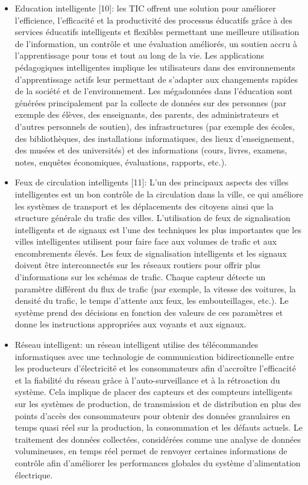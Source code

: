 \documentclass[french, a4paper, 12pt]{report}
\begin{document}
\begin{itemize}
\item \textbf{}Education intelligente [10]: les TIC offrent une solution pour améliorer l'efficience, l'efficacité et la productivité des processus éducatifs grâce à des services éducatifs intelligents et flexibles permettant une meilleure utilisation de l'information, un contrôle et une évaluation améliorés, un soutien accru à l'apprentissage pour tous et tout au long de la vie. Les applications pédagogiques intelligentes implique les utilisateurs dans des environnements d’apprentissage actifs leur permettant de s’adapter aux changements rapides de la société et de l’environnement. Les mégadonnées dans l'éducation sont générées principalement par la collecte de données sur des personnes (par exemple des élèves, des enseignants, des parents, des administrateurs et d'autres personnels de soutien), des infrastructures (par exemple des écoles, des bibliothèques, des installations informatiques, des lieux d'enseignement, des musées et des universités) et des informations (cours, livres, examens, notes, enquêtes économiques, évaluations, rapports, etc.). 
\item \textbf{}Feux de circulation intelligents [11]: L’un des principaux aspects des villes intelligentes est un bon contrôle de la circulation dans la ville, ce qui améliore les systèmes de transport et les déplacements des citoyens ainsi que la structure générale du trafic des villes. L'utilisation de feux de signalisation intelligents et de signaux est l'une des techniques les plus importantes que les villes intelligentes utilisent pour faire face aux volumes de trafic et aux encombrements élevés. Les feux de signalisation intelligents et les signaux doivent être interconnectés sur les réseaux routiers pour offrir plus d'informations sur les schémas de trafic. Chaque capteur détecte un paramètre différent du flux de trafic (par exemple, la vitesse des voitures, la densité du trafic, le temps d'attente aux feux, les embouteillages, etc.). Le système prend des décisions en fonction des valeurs de ces paramètres et donne les instructions appropriées aux voyants et aux signaux. 
\item \textbf{}Réseau intelligent: un réseau intelligent utilise des télécommandes informatiques avec une technologie de communication bidirectionnelle entre les producteurs d'électricité et les consommateurs afin d'accroître l'efficacité et la fiabilité du réseau grâce à l'auto-surveillance et à la rétroaction du système. Cela implique de placer des capteurs et des compteurs intelligents sur les systèmes de production, de transmission et de distribution en plus des points d'accès des consommateurs pour obtenir des données granulaires en temps quasi réel sur la production, la consommation et les défauts actuels. Le traitement des données collectées, considérées comme une analyse de données volumineuses, en temps réel permet de renvoyer certaines informations de contrôle afin d'améliorer les performances globales du système d'alimentation électrique.

\end{itemize}
\end{document}
